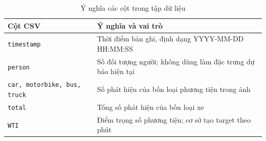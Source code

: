 \begin{table}[htbp]
        \centering
        \caption{Ý nghĩa các cột trong tập dữ liệu}
        \vspace{0.2cm}
        \begin{tabular}{|p{4cm}|p{12cm}|}
            \hline
            \textbf{Cột CSV} & \textbf{Ý nghĩa và vai trò} \\
            \hline
            \texttt{timestamp} & Thời điểm bản ghi, định dạng YYYY-MM-DD HH:MM:SS \\
            \hline
            \texttt{person} & Số đối tượng người; không dùng làm đặc trưng dự báo hiện tại \\
            \hline
            \texttt{car, motorbike, bus, truck} & Số phát hiện của bốn loại phương tiện trong ảnh \\
            \hline
            \texttt{total} & Tổng số phát hiện của bốn loại xe \\
            \hline
            \texttt{WTI} & Điểm trọng số phương tiện; cơ sở tạo target theo phút \\
            \hline
        \end{tabular}
    \end{table}